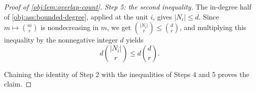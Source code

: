 \begin{proof}[Proof of \cref{obj:lem:overlap-count}]
\emph{Step 5: the second inequality.}  The in-degree half of \cref{obj:ass:bounded-degree}, applied at the unit \(i\), gives \(|N_i|\le d\).  Since \(m\mapsto\binom{m}{r}\) is nondecreasing in \(m\), we get \(\binom{|N_i|}{r}\le\binom{d}{r}\), and multiplying this inequality by the nonnegative integer \(d\) yields
\[
d\binom{|N_i|}{r}\le d\binom{d}{r}.
\]

Chaining the identity of Step 2 with the inequalities of Steps 4 and 5 proves the claim. %
\end{proof}
